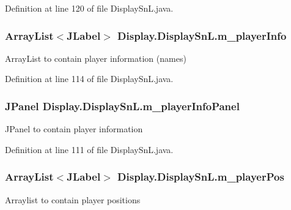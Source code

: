Definition at line 120 of file Display\+Sn\+L.\+java.

\hypertarget{class_display_1_1_display_sn_l_ad4d75120b08606844b7fa63e2990928b}{}
\subsubsection[{m\+\_\+player\+Info}]{\setlength{\rightskip}{0pt plus 5cm}Array\+List$<$J\+Label$>$ Display.\+Display\+Sn\+L.\+m\+\_\+player\+Info\hspace{0.3cm}{\ttfamily [private]}}\label{class_display_1_1_display_sn_l_ad4d75120b08606844b7fa63e2990928b}
Array\+List to contain player information (names) 

Definition at line 114 of file Display\+Sn\+L.\+java.

\hypertarget{class_display_1_1_display_sn_l_a7afa5f7ca8e697b64de4de4246f2c2a8}{}
\subsubsection[{m\+\_\+player\+Info\+Panel}]{\setlength{\rightskip}{0pt plus 5cm}J\+Panel Display.\+Display\+Sn\+L.\+m\+\_\+player\+Info\+Panel\hspace{0.3cm}{\ttfamily [private]}}\label{class_display_1_1_display_sn_l_a7afa5f7ca8e697b64de4de4246f2c2a8}
J\+Panel to contain player information 

Definition at line 111 of file Display\+Sn\+L.\+java.

\hypertarget{class_display_1_1_display_sn_l_aa4b30638e1d8f99b5052652ea02d6365}{}
\subsubsection[{m\+\_\+player\+Pos}]{\setlength{\rightskip}{0pt plus 5cm}Array\+List$<$J\+Label$>$ Display.\+Display\+Sn\+L.\+m\+\_\+player\+Pos\hspace{0.3cm}{\ttfamily [private]}}\label{class_display_1_1_display_sn_l_aa4b30638e1d8f99b5052652ea02d6365}
Arraylist to contain player positions 

